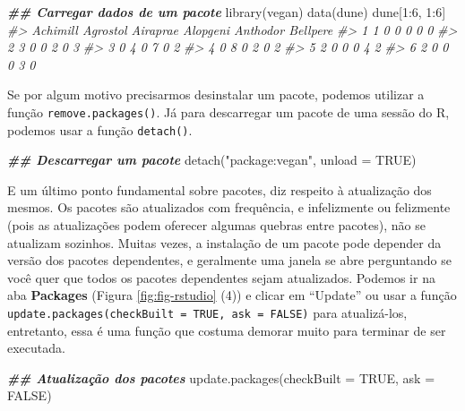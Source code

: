 \documentclass[
]{book}
\newenvironment{Shaded}{\begin{snugshade}}{\end{snugshade}}
\newcommand{\AttributeTok}[1]{\textcolor[rgb]{0.61,0.61,0.61}{#1}}
\newcommand{\CommentTok}[1]{\textcolor[rgb]{0.37,0.37,0.37}{\textit{#1}}}
\newcommand{\ConstantTok}[1]{\textcolor[rgb]{0,0,0}{#1}}
\newcommand{\DecValTok}[1]{\textcolor[rgb]{0.06,0.06,0.06}{#1}}
\newcommand{\DocumentationTok}[1]{\textcolor[rgb]{0.37,0.37,0.37}{\textbf{\textit{#1}}}}
\newcommand{\FunctionTok}[1]{\textcolor[rgb]{0,0,0}{#1}}
\newcommand{\NormalTok}[1]{#1}
\newcommand{\SpecialCharTok}[1]{\textcolor[rgb]{0,0,0}{#1}}
\newcommand{\StringTok}[1]{\textcolor[rgb]{0.5,0.5,0.5}{#1}}
\begin{document}
\begin{Shaded}
\begin{Highlighting}[]
\DocumentationTok{\#\# Carregar dados de um pacote}
\FunctionTok{library}\NormalTok{(vegan)}
\FunctionTok{data}\NormalTok{(dune)}
\NormalTok{dune[}\DecValTok{1}\SpecialCharTok{:}\DecValTok{6}\NormalTok{, }\DecValTok{1}\SpecialCharTok{:}\DecValTok{6}\NormalTok{]}
\CommentTok{\#\textgreater{}   Achimill Agrostol Airaprae Alopgeni Anthodor Bellpere}
\CommentTok{\#\textgreater{} 1        1        0        0        0        0        0}
\CommentTok{\#\textgreater{} 2        3        0        0        2        0        3}
\CommentTok{\#\textgreater{} 3        0        4        0        7        0        2}
\CommentTok{\#\textgreater{} 4        0        8        0        2        0        2}
\CommentTok{\#\textgreater{} 5        2        0        0        0        4        2}
\CommentTok{\#\textgreater{} 6        2        0        0        0        3        0}
\end{Highlighting}
\end{Shaded}

Se por algum motivo precisarmos desinstalar um pacote, podemos utilizar a função \texttt{remove.packages()}. Já para descarregar um pacote de uma sessão do R, podemos usar a função \texttt{detach()}.

\begin{Shaded}
\begin{Highlighting}[]
\DocumentationTok{\#\# Descarregar um pacote}
\FunctionTok{detach}\NormalTok{(}\StringTok{"package:vegan"}\NormalTok{, }\AttributeTok{unload =} \ConstantTok{TRUE}\NormalTok{)}
\end{Highlighting}
\end{Shaded}

E um último ponto fundamental sobre pacotes, diz respeito à atualização dos mesmos. Os pacotes são atualizados com frequência, e infelizmente ou felizmente (pois as atualizações podem oferecer algumas quebras entre pacotes), não se atualizam sozinhos. Muitas vezes, a instalação de um pacote pode depender da versão dos pacotes dependentes, e geralmente uma janela se abre perguntando se você quer que todos os pacotes dependentes sejam atualizados. Podemos ir na aba \textbf{Packages} (Figura \ref{fig:fig-rstudio} (4)) e clicar em ``Update'' ou usar a função \texttt{update.packages(checkBuilt\ =\ TRUE,\ ask\ =\ FALSE)} para atualizá-los, entretanto, essa é uma função que costuma demorar muito para terminar de ser executada.

\begin{Shaded}
\begin{Highlighting}[]
\DocumentationTok{\#\# Atualização dos pacotes}
\FunctionTok{update.packages}\NormalTok{(}\AttributeTok{checkBuilt =} \ConstantTok{TRUE}\NormalTok{, }\AttributeTok{ask =} \ConstantTok{FALSE}\NormalTok{)}
\end{Highlighting}
\end{Shaded}
\end{document}
